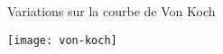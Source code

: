 \documentclass[10pt]{beamer}
\begin{document}
\begin{frame}{Variations sur la courbe de Von Koch}
  \begin{center}
    \texttt{[image: von-koch]}
  \end{center}
\end{frame}



\questionSlide

 \appendix
 \backupSlides







\end{document}
